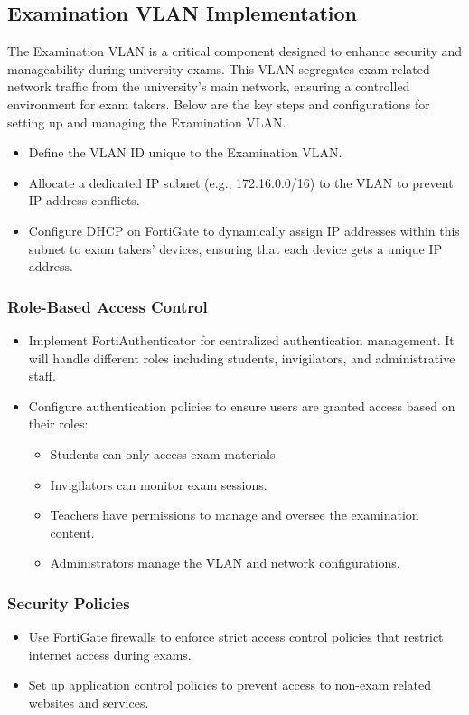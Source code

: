 \documentclass[12pt]{report}
\begin{document}
\subsection{Examination VLAN Implementation}
The Examination VLAN is a critical component designed to enhance security and manageability during university exams. This VLAN segregates exam-related network traffic from the university's main network, ensuring a controlled environment for exam takers. Below are the key steps and configurations for setting up and managing the Examination VLAN.
\begin{itemize}
    \item Define the VLAN ID unique to the Examination VLAN.
    \item Allocate a dedicated IP subnet (e.g., 172.16.0.0/16) to the VLAN to prevent IP address conflicts.
    \item Configure DHCP on FortiGate to dynamically assign IP addresses within this subnet to exam takers' devices, ensuring that each device gets a unique IP address.
\end{itemize}

\subsubsection{Role-Based Access Control}
\begin{itemize}
    \item Implement FortiAuthenticator for centralized authentication management. It will handle different roles including students, invigilators, and administrative staff.
    \item Configure authentication policies to ensure users are granted access based on their roles:
    \begin{itemize}
        \item Students can only access exam materials.
        \item Invigilators can monitor exam sessions.
        \item Teachers have permissions to manage and oversee the examination content.
        \item Administrators manage the VLAN and network configurations.
    \end{itemize}
\end{itemize}

\subsubsection{Security Policies}
\begin{itemize}
    \item Use FortiGate firewalls to enforce strict access control policies that restrict internet access during exams.
    \item Set up application control policies to prevent access to non-exam related websites and services.
\end{itemize}
\end{document}
